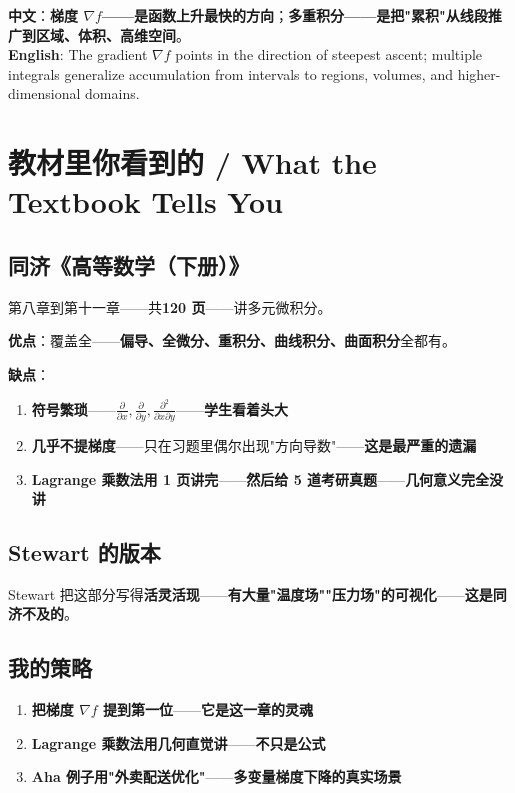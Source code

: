 \begin{tcolorbox}[essbox={一句话本质}]
\textbf{中文}：\textbf{梯度 $\nabla f$——是函数上升最快的方向}；\textbf{多重积分——是把"累积"从线段推广到区域、体积、高维空间}。\\[6pt]
\textbf{English}: The gradient $\nabla f$ points in the direction of steepest ascent; multiple integrals generalize accumulation from intervals to regions, volumes, and higher-dimensional domains.
\end{tcolorbox}

\section{教材里你看到的 / What the Textbook Tells You}

\subsection{同济《高等数学（下册）》}

第八章到第十一章——共\textbf{120 页}——讲多元微积分。

\textbf{优点}：覆盖全——\textbf{偏导、全微分、重积分、曲线积分、曲面积分}全都有。

\textbf{缺点}：

\begin{enumerate}
\item \textbf{符号繁琐}——$\frac{\partial}{\partial x}, \frac{\partial}{\partial y}, \frac{\partial^2}{\partial x \partial y}$——\textbf{学生看着头大}
\item \textbf{几乎不提\textbf{梯度}}——只在习题里偶尔出现"方向导数"——\textbf{这是最严重的遗漏}
\item \textbf{Lagrange 乘数法\textbf{用 1 页讲完}}——\textbf{然后给 5 道考研真题}——\textbf{几何意义完全没讲}
\end{enumerate}

\subsection{Stewart 的版本}

Stewart 把这部分写得\textbf{活灵活现}——\textbf{有大量"温度场""压力场"的可视化}——\textbf{这是同济不及的}。

\subsection{我的策略}

\begin{enumerate}
\item \textbf{把梯度 $\nabla f$ 提到第一位}——\textbf{它是这一章的灵魂}
\item \textbf{Lagrange 乘数法用几何直觉讲}——\textbf{不只是公式}
\item \textbf{Aha 例子用"外卖配送优化"}——\textbf{多变量梯度下降的真实场景}
\end{enumerate}

